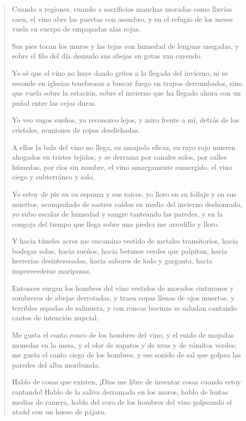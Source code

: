 \documentclass[12pt]{article}
\begin{document}
\clearpage
{}
\begin{verse}
Cuando a regiones, cuando a sacrificios  
manchas moradas como lluvias caen,  
el vino abre las puertas con asombro,  
y en el refugio de los meses vuela  
su cuerpo de empapadas alas rojas.  
	
Sus pies tocan los muros y las tejas  
con humedad de lenguas anegadas,  
y sobre el filo del día desnudo  
sus abejas en gotas van cayendo.  
	
Yo sé que el vino no huye dando gritos  
a la llegada del invierno,  
ni se esconde en iglesias tenebrosas  
a buscar fuego en trapos derrumbados,  
sino que vuela sobre la estación,  
sobre el invierno que ha llegado ahora  
con un puñal entre las cejas duras.  
	
Yo veo vagos sueños,  
yo reconozco lejos,  
y miro frente a mí, detrás de los cristales,  
reuniones de ropas desdichadas.  
	
A ellas la bala del vino no llega,  
su amapola eficaz, su rayo rojo  
mueren ahogados en tristes tejidos,  
y se derrama por canales solos,  
por calles húmedas, por ríos sin nombre,  
el vino amargamente sumergido,  
el vino ciego y subterráneo y solo.  
	
Yo estoy de pie en su espuma y sus raíces,  
yo lloro en su follaje y en sus muertos,  
acompañado de sastres caídos  
en medio del invierno deshonrado,  
yo subo escalas de humedad y sangre  
tanteando las paredes,  
y en la congoja del tiempo que llega  
sobre una piedra me arrodillo y lloro.  
	
Y hacia túneles acres me encamino  
vestido de metales transitorios,  
hacia bodegas solas, hacia sueños,  
hacia betunes verdes que palpitan,  
hacia herrerías desinteresadas,  
hacia sabores de lodo y garganta,  
hacia imperecederas mariposas.  
	
Entonces surgen los hombres del vino  
vestidos de morados cinturones  
y sombreros de abejas derrotadas,  
y traen copas llenas de ojos muertos,  
y terribles espadas de salmuera,  
y con roncas bocinas se saludan  
cantando cantos de intención nupcial.  
	
Me gusta el canto ronco de los hombres del vino,  
y el ruido de mojadas monedas en la mesa,  
y el olor de zapatos y de uvas  
y de vómitos verdes:  
me gusta el canto ciego de los hombres,  
y ese sonido de sal que golpea  
las paredes del alba moribunda.  
	
Hablo de cosas que existen, ¡Dios me libre  
de inventar cosas cuando estoy cantando!  
Hablo de la saliva derramada en los muros,  
hablo de lentas medias de ramera,  
hablo del coro de los hombres del vino  
golpeando el ataúd con un hueso de pájaro.  
	

\end{verse}
\end{document}
